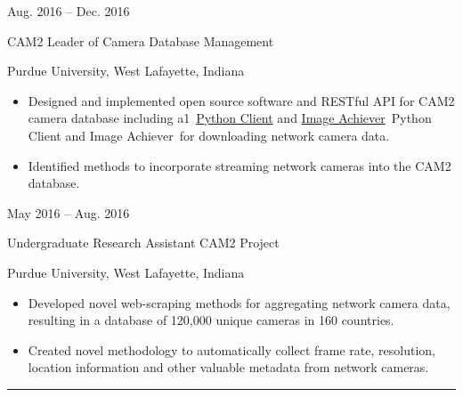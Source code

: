 \documentclass[10pt]{article}
\newlength{\cvcolumngapwidth}
\newlength{\cvleftcolumnwidth}
\newlength{\cvrightcolumnwidth}
\newcommand{\cvsectionstyle}[1]{{\normalsize\cvsectionfont\textcolor{cvsectioncolor}{#1}}}
\newcommand{\cvtitlestyle}[1]{{\large\cvtitlefont\textcolor{cvtitlecolor}{#1}}}
\newcommand{\cvdurationstyle}[1]{{\small\cvdurationfont\textcolor{cvdurationcolor}{#1}}}
\newlength{\cvafteritemskipamount}
\newlength{\cvaftersectionskipamount}
\newlength{\cvparskip}
\newcommand{\cvsection}[1]{
    \begin{minipage}[t]{\cvleftcolumnwidth}
        \raggedleft\cvsectionstyle{#1}
    \end{minipage}%
    \hspace{\cvcolumngapwidth}%
    \begin{minipage}[t]{\cvrightcolumnwidth}
        \textcolor{cvrulecolor}{\rule{\cvrightcolumnwidth}{0.3mm}}
    \end{minipage}

    \vspace{\cvaftersectionskipamount}
}
\newcommand{\cvitem}[2]{
    \begin{minipage}[t]{\cvleftcolumnwidth}
        \raggedleft #1
    \end{minipage}%
    \hspace{\cvcolumngapwidth}%
    \begin{minipage}[t]{\cvrightcolumnwidth}
        \setlength{\parskip}{\cvparskip} #2
    \end{minipage}

    \vspace{\cvafteritemskipamount}
}
\newcommand{\cvtitle}[1]{
    \cvtitlestyle{#1}

    \vspace{1mm plus 0.25mm minus 0.25mm}
    \vspace{-\cvparskip}
}
\def\online{1}
\begin{document}
\cvitem{
    \cvdurationstyle{Aug. 2016 -- Dec. 2016}
}{
    \cvtitle{CAM2 Leader of Camera Database Management}

    Purdue University, West Lafayette, Indiana

    \begin{itemize}[leftmargin=*]
        \item Designed and implemented open source software and RESTful API for CAM2 camera database including a\if\online1~\href{https://github.com/PurdueCAM2Project/CameraDatabaseClient}{Python Client} and \href{https://github.com/PurdueCAM2Project/CAM2ImageArchiver}{Image Achiever}\else~Python Client and Image Achiever\fi~for downloading network camera data.
        \item Identified methods to incorporate streaming network cameras into the CAM2 database.
    \end{itemize}
}

\cvitem{
    \cvdurationstyle{May 2016 -- Aug. 2016}
}{
    \cvtitle{Undergraduate Research Assistant CAM2 Project}

    Purdue University, West Lafayette, Indiana

    \begin{itemize}[leftmargin=*]
        \item Developed novel web-scraping methods for aggregating network camera data, resulting in a database of 120,000 unique cameras in 160 countries.
        \item Created novel methodology to automatically collect frame rate, resolution, location information and other valuable metadata from network cameras.
    \end{itemize}
}

\fi

\cvsection{PUBLICATIONS}
\end{document}
